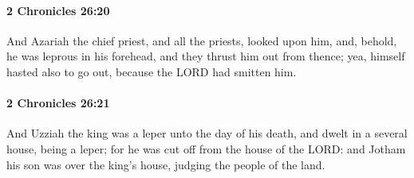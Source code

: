 		\paragraph{2 Chronicles 26:20} %
			\label{2CHRONICLES-26-20}

			And Azariah the chief priest, and all the priests, looked upon him, and, behold, he was leprous in his forehead, and they thrust him out from thence; yea, himself hasted also to go out, because the LORD had smitten him.


		\paragraph{2 Chronicles 26:21} %
			\label{2CHRONICLES-26-21}

			And Uzziah the king was a leper unto the day of his death, and dwelt in a several house, being a leper; for he was cut off from the house of the LORD: and Jotham his son was over the king's house, judging the people of the land.

